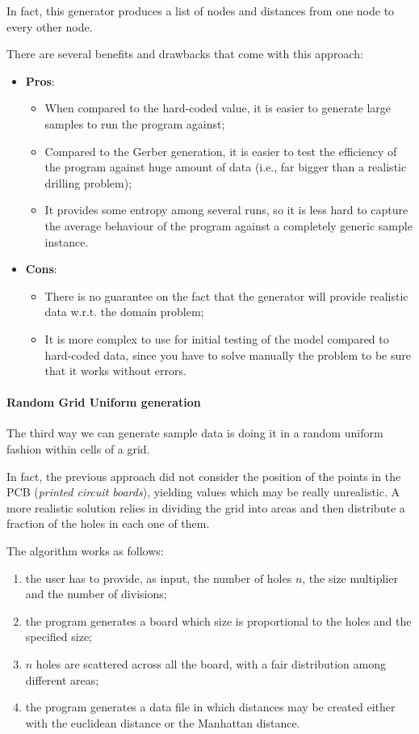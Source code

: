 In fact, this generator produces a list of nodes and distances from one node to
every other node.

There are several benefits and drawbacks that come with this approach:

\begin{itemize}
  \item \textbf{Pros}:
  \begin{itemize}
    \item When compared to the hard-coded value, it is easier to generate large
      samples to run the program against;
    \item Compared to the Gerber generation, it is easier to test the
		  efficiency of the program against huge amount of data (i.e., far bigger
			than a realistic drilling problem);
    \item It provides some entropy among several runs, so it is less hard to
      capture the average behaviour of the program against a completely generic
      sample instance.
  \end{itemize}
  \item \textbf{Cons}:
  \begin{itemize}
    \item There is no guarantee on the fact that the generator will provide
      realistic data w.r.t. the domain problem;
    \item It is more complex to use for initial testing of the model compared
      to hard-coded data, since you have to solve manually the problem to be
      sure that it works without errors.
  \end{itemize}
\end{itemize}

\paragraph{Random Grid Uniform generation} The third way we can generate sample
data is doing it in a random uniform fashion within cells of a grid.

In fact, the previous approach did not consider the position of the points in
the PCB (\textit{printed circuit boards}), yielding values which may be really
unrealistic. A more realistic solution relies in dividing the grid into areas
and then distribute a fraction of the holes in each one of them.

The algorithm works as follows:
\begin{enumerate}
	\item the user has to provide, as input, the number of holes $n$, the size
	  multiplier and the number of divisions;
	\item the program generates a board which size is proportional to the holes
		and the specified size;
	\item $n$ holes are scattered across all the board, with a fair distribution
	  among different areas;
	\item the program generates a data file in which distances may be created
		either with the euclidean distance or the Manhattan distance.
\end{enumerate}

